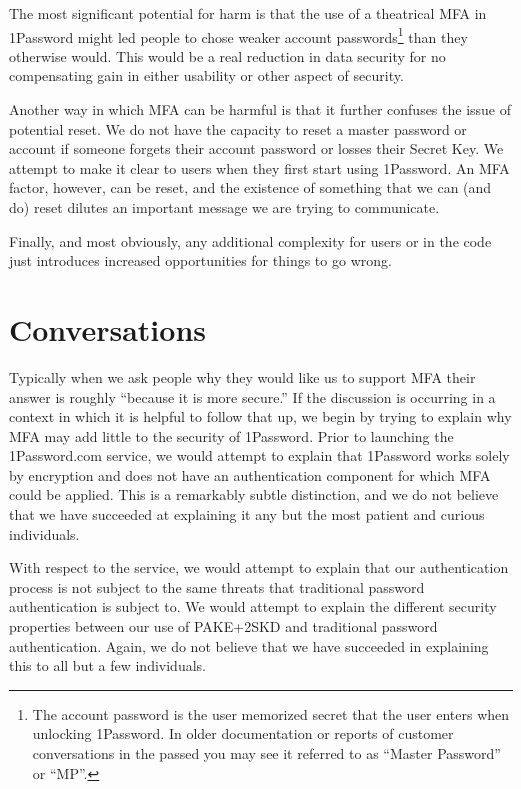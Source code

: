\documentclass[12pt]{article}
\begin{document}
The most significant potential for harm is that
the use of a theatrical MFA in 1Password might led people to
chose weaker account passwords\footnote{%
  The account password is the user memorized secret that the user enters when unlocking 1Password.
  In older documentation or reports of customer conversations in the passed you may see it referred to as “Master Password” or “MP”.}
than they otherwise would.
This would be a real reduction in data security for no compensating gain in either usability or other aspect of security.

Another way in which MFA can be harmful is that it further confuses the issue of potential reset. We do not have the capacity to reset a master password or account if someone forgets their account password or losses their Secret Key. We attempt to make it clear to users when they first start using 1Password. An MFA factor, however, can be reset, and the existence of something that we can (and do) reset dilutes an important message we are trying to communicate.

Finally, and most obviously, any additional complexity for users or in the code just introduces increased opportunities for things to go wrong.

\section{Conversations}

Typically when we ask people why they would like us to support MFA their answer is roughly “because it is more secure.” 
If the discussion is occurring in a context in which it is helpful to follow that up,
we begin by trying to explain why MFA may add little to the security of 1Password.
Prior to launching the 1Password.com service, we would attempt to explain that
1Password works solely by encryption and does not have an authentication component for which MFA could be applied.
This is a remarkably subtle distinction,
and we do not believe that we have succeeded at explaining it any but the
most patient and curious individuals.

With respect to the service, we would attempt to explain that our authentication process is not subject to the same threats that traditional password authentication is subject to.
We would attempt to explain the different security properties between our use of PAKE+2SKD and traditional password authentication.
Again, we do not believe that we have succeeded in explaining this to all but
a few individuals.
\end{document}
